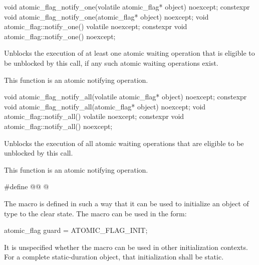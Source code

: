 %
%
\begin{itemdecl}
void atomic_flag_notify_one(volatile atomic_flag* object) noexcept;
constexpr void atomic_flag_notify_one(atomic_flag* object) noexcept;
void atomic_flag::notify_one() volatile noexcept;
constexpr void atomic_flag::notify_one() noexcept;
\end{itemdecl}

\begin{itemdescr}
\pnum
\effects
Unblocks the execution of at least one atomic waiting operation
that is eligible to be unblocked by this call,
if any such atomic waiting operations exist.

\pnum
\remarks
This function is an atomic notifying operation.
\end{itemdescr}

%
%
\begin{itemdecl}
void atomic_flag_notify_all(volatile atomic_flag* object) noexcept;
constexpr void atomic_flag_notify_all(atomic_flag* object) noexcept;
void atomic_flag::notify_all() volatile noexcept;
constexpr void atomic_flag::notify_all() noexcept;
\end{itemdecl}

\begin{itemdescr}
\pnum
\effects
Unblocks the execution of all atomic waiting operations
that are eligible to be unblocked by this call.

\pnum
\remarks
This function is an atomic notifying operation.
\end{itemdescr}

\begin{itemdecl}
#define @@ @\seebelow@
\end{itemdecl}

\begin{itemdescr}
\pnum
\remarks
The macro  is defined in such a way that
it can be used to initialize an object of type 
to the clear state.
The macro can be used in the form:
\begin{codeblock}
atomic_flag guard = ATOMIC_FLAG_INIT;
\end{codeblock}
It is unspecified whether the macro can be used
in other initialization contexts.
For a complete static-duration object, that initialization shall be static.
\end{itemdescr}

